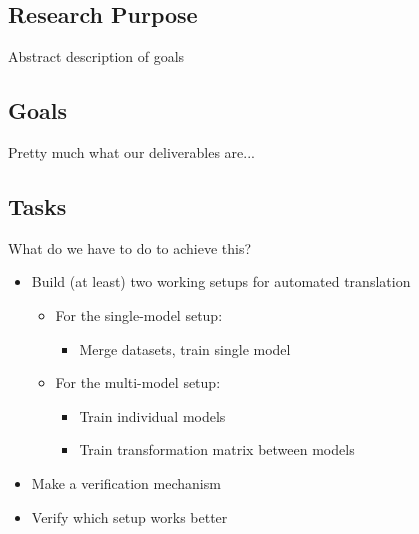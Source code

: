 \subsection{Research Purpose}
Abstract description of goals

\lipsum[66]

\subsection{Goals}
Pretty much what our deliverables are...

\subsection{Tasks}
What do we have to do to achieve this?
\begin{itemize}
  \item Build (at least) two working setups for automated translation
    \begin{itemize}
      \item For the single-model setup:
      \begin{itemize}
        \item Merge datasets, train single model
      \end{itemize}
      \item For the multi-model setup:
      \begin{itemize}
        \item Train individual models
        \item Train transformation matrix between models
      \end{itemize}
    \end{itemize}
  \item Make a verification mechanism
  \item Verify which setup works better
\end{itemize}

